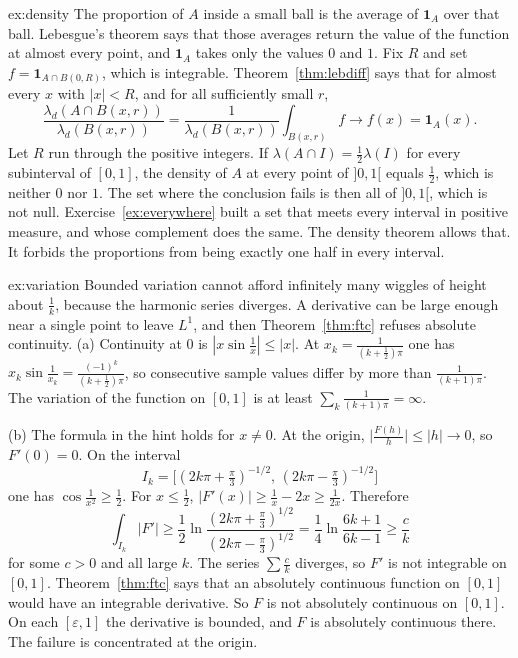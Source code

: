 \begin{solution}{ex:density}
\idea The proportion of $A$ inside a small ball is the average of $\mathbf 1_A$ over that ball. Lebesgue's theorem says that those averages return the value of the function at almost every point, and $\mathbf 1_A$ takes only the values $0$ and $1$.
\writeup Fix $R$ and set $f=\mathbf 1_{A\cap B(0,R)}$, which is integrable. Theorem~\ref{thm:lebdiff} says that for almost every $x$ with $|x|<R$, and for all sufficiently small $r$,
\[
\frac{\lambda_d(A\cap B(x,r))}{\lambda_d(B(x,r))}=\frac1{\lambda_d(B(x,r))}\int_{B(x,r)}f\to f(x)=\mathbf 1_A(x).
\]
Let $R$ run through the positive integers. If $\lambda(A\cap I)=\frac12\lambda(I)$ for every subinterval of $[0,1]$, the density of $A$ at every point of $]0,1[$ equals $\frac12$, which is neither $0$ nor $1$. The set where the conclusion fails is then all of $]0,1[$, which is not null. Exercise~\ref{ex:everywhere} built a set that meets every interval in positive measure, and whose complement does the same. The density theorem allows that. It forbids the proportions from being exactly one half in every interval.
\end{solution}

\begin{solution}{ex:variation}
\idea Bounded variation cannot afford infinitely many wiggles of height about $\frac1k$, because the harmonic series diverges. A derivative can be large enough near a single point to leave $L^1$, and then Theorem~\ref{thm:ftc} refuses absolute continuity.
\writeup (a) Continuity at $0$ is $|x\sin\frac1x|\le|x|$. At $x_k=\frac1{(k+\frac12)\pi}$ one has $x_k\sin\frac1{x_k}=\frac{(-1)^k}{(k+\frac12)\pi}$, so consecutive sample values differ by more than $\frac1{(k+1)\pi}$. The variation of the function on $[0,1]$ is at least $\sum_k\frac1{(k+1)\pi}=\infty$.

(b) The formula in the hint holds for $x\ne0$. At the origin, $\bigl|\frac{F(h)}h\bigr|\le|h|\to0$, so $F'(0)=0$. On the interval
\[
I_k=\bigl[(2k\pi+\tfrac\pi3)^{-1/2},\,(2k\pi-\tfrac\pi3)^{-1/2}\bigr]
\]
one has $\cos\frac1{x^2}\ge\frac12$. For $x\le\frac12$, $|F'(x)|\ge\frac1x-2x\ge\frac1{2x}$. Therefore
\[
\int_{I_k}|F'|\ge\frac12\ln\frac{(2k\pi+\frac\pi3)^{1/2}}{(2k\pi-\frac\pi3)^{1/2}}=\frac14\ln\frac{6k+1}{6k-1}\ge\frac c k
\]
for some $c>0$ and all large $k$. The series $\sum\frac ck$ diverges, so $F'$ is not integrable on $[0,1]$. Theorem~\ref{thm:ftc} says that an absolutely continuous function on $[0,1]$ would have an integrable derivative. So $F$ is not absolutely continuous on $[0,1]$. On each $[\varepsilon,1]$ the derivative is bounded, and $F$ is absolutely continuous there. The failure is concentrated at the origin.
\end{solution}


